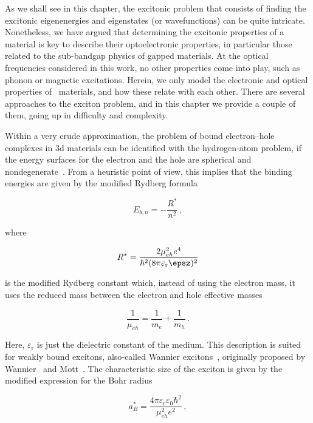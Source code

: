 As we shall see in this chapter, the excitonic problem that consists of finding the excitonic eigenenergies and eigenstates (or wavefunctions) can be quite intricate.
Nonetheless, we have argued that determining the excitonic properties of a material is key to describe their optoelectronic properties, in particular those related to the sub-bandgap physics of gapped materials.
At the optical frequencies considered in this work, no other properties come into play, such as phonon or magnetic excitations.
Herein, we only model the electronic and optical properties of \bd~materials, and how these relate with each other.
There are several approaches to the exciton problem, and in this chapter we provide a couple of them, going up in difficulty and complexity.

Within a very crude approximation, the problem of bound electron--hole complexes in \gls{3d} materials can be identified with the hydrogen-atom problem, if the energy surfaces for the electron and the hole are spherical and nondegenerate~\cite{Kittel_2004}.
From a heuristic point of view, this implies that the binding energies are given by the modified Rydberg formula

\begin{equation}
    E_{b,n} = - \frac{R^*}{n^2}\,,
\end{equation}

\noindent where

\begin{equation}
    \label{eq:Rydberg_modified}
    R^* = \frac{2 \mu_{eh}^2 e^4}{\hbar^2 (8 \pi \varepsilon_{\mathrm{r}} \epsz)^2}
\end{equation}

\noindent is the modified Rydberg constant which, instead of using the electron mass, it uses the reduced mass between the electron and hole effective masses

\begin{equation}
    \frac{1}{\mu_{eh}} = \frac{1}{m_e} + \frac{1}{m_h}\,.
\end{equation}

\noindent Here, $\varepsilon_{\mathrm{r}}$ is just the dielectric constant of the medium.
This description is suited for weakly bound excitons, also-called Wannier excitons~\cite{Koch_2009}, originally proposed by Wannier~\cite{Wannier_1937} and Mott~\cite{Mott_Littleton_1938,Mott_1938_II,Mott_1938_III}.
The characteristic size of the exciton is given by the modified expression for the Bohr radius

\begin{equation}
    a_B^* = \frac{4 \pi \varepsilon_{\mathrm{r}} \varepsilon_0 \hbar^2}{\mu_{eh}^2 e^2}\,,
\end{equation}

